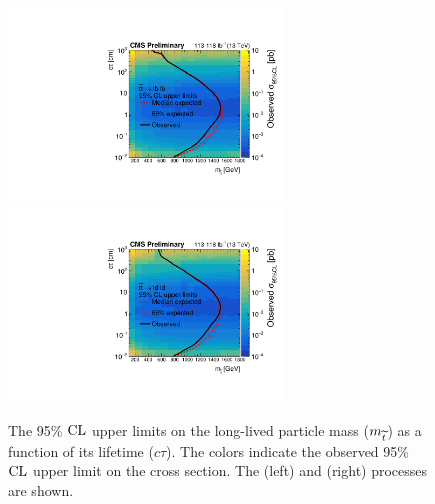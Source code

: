 \begin{figure}
\centering
\includegraphics[width=0.65\textwidth]{figures/results/2DlimitsCombinedStopToLB.pdf}
\includegraphics[width=0.65\textwidth]{figures/results/2DlimitsCombinedStopToLD.pdf}
\caption{The 95\% $\text{CL}$ upper limits on the long-lived particle mass ($m_{\widetilde{t}}$) as a function of its lifetime ($c\tau$). The colors indicate the observed 95\% $\text{CL}$ upper limit on the cross section. The \stoptolb (left) and \stoptold (right) processes are shown.} 
\label{limits_combined}
\end{figure}